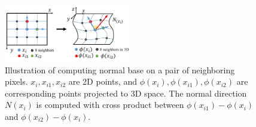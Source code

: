 
\begin{figure}
\centering
\includegraphics[width=0.5\textwidth]{figures/d2n.pdf}
\caption{Illustration of computing normal base on a pair of neighboring pixels. $x_i, x_{i1}, x_{i2}$ are 2D points, and 
$\phi(x_i), \phi(x_{i1}), \phi(x_{i2})$ are corresponding points projected to 3D space. 
The normal direction $N(x_i)$ is computed with cross product between $\phi(x_{i1}) - \phi(x_i)$ and $\phi(x_{i2}) - \phi(x_i)$.}
\vspace{-0.7\baselineskip}
\label{fig:d2n}
\end{figure}

